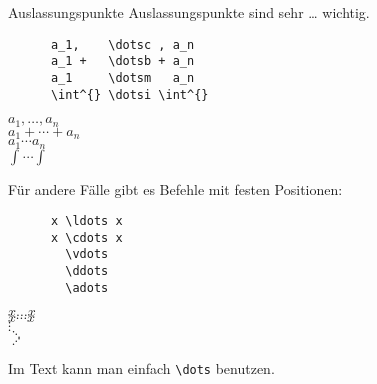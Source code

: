 \begin{frame}[fragile]{Auslassungspunkte}
  Auslassungspunkte sind sehr … wichtig.
  \begin{CodeExample}{0.5}
    \begin{lstlisting}
      a_1,    \dotsc , a_n
      a_1 +   \dotsb + a_n
      a_1     \dotsm   a_n
      \int^{} \dotsi \int^{}
    \end{lstlisting}
  \CodeResult
    \strut
    $a_1,    \dotsc , a_n$ \\
    $a_1 +   \dotsb + a_n$ \\
    $a_1     \dotsm   a_n$ \\
    $\int^{} \dotsi \int^{}$
  \end{CodeExample}

  Für andere Fälle gibt es Befehle mit festen Positionen:
  \begin{CodeExample}{0.5}
    \begin{lstlisting}
      x \ldots x
      x \cdots x
        \vdots
        \ddots
        \adots
    \end{lstlisting}
  \CodeResult
    \strut
    $x \ldots x$ \\
    $x \cdots x$ \\
    $\vdots$ \\
    $\ddots$ \\
    $\adots$
  \end{CodeExample}

  Im Text kann man einfach \lstinline+\dots+ benutzen.
\end{frame}

